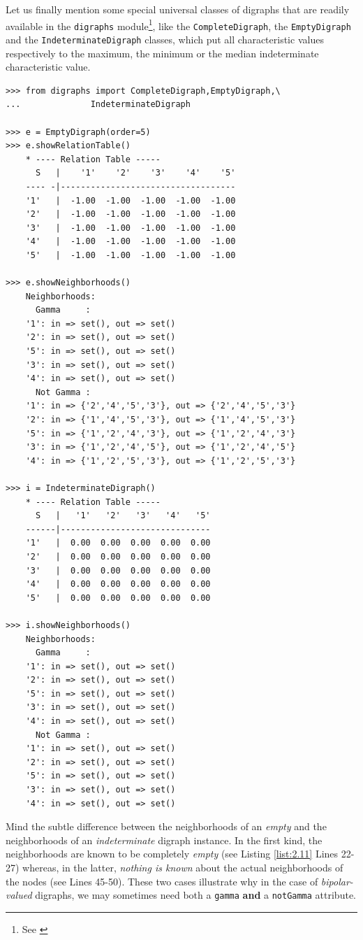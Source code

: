Let us finally mention some special universal classes of digraphs that are readily available in the \texttt{digraphs} module\footnote{See \citealp{BIS-2021}}, like the \texttt{CompleteDigraph}, the \texttt{EmptyDigraph} and the \texttt{IndeterminateDigraph} classes, which put all characteristic values respectively to the maximum, the minimum or the median indeterminate characteristic value.
\begin{lstlisting}[caption={Complete, empty and indeterminate digraphs},label=list:2.11]
>>> from digraphs import CompleteDigraph,EmptyDigraph,\
...   			 IndeterminateDigraph
   
>>> e = EmptyDigraph(order=5)
>>> e.showRelationTable()
    * ---- Relation Table -----
      S   |    '1'    '2'    '3'    '4'	   '5'	  
    ---- -|-----------------------------------
    '1'   |  -1.00  -1.00  -1.00  -1.00	 -1.00	 
    '2'   |  -1.00  -1.00  -1.00  -1.00	 -1.00	 
    '3'   |  -1.00  -1.00  -1.00  -1.00	 -1.00	 
    '4'   |  -1.00  -1.00  -1.00  -1.00	 -1.00	 
    '5'   |  -1.00  -1.00  -1.00  -1.00	 -1.00

>>> e.showNeighborhoods() 
    Neighborhoods:
      Gamma     :
    '1': in => set(), out => set()
    '2': in => set(), out => set()
    '5': in => set(), out => set()
    '3': in => set(), out => set()
    '4': in => set(), out => set()
      Not Gamma :
    '1': in => {'2','4','5','3'}, out => {'2','4','5','3'}
    '2': in => {'1','4','5','3'}, out => {'1','4','5','3'}
    '5': in => {'1','2','4','3'}, out => {'1','2','4','3'}
    '3': in => {'1','2','4','5'}, out => {'1','2','4','5'}
    '4': in => {'1','2','5','3'}, out => {'1','2','5','3'}

>>> i = IndeterminateDigraph()
    * ---- Relation Table -----
      S   |   '1'   '2'	  '3'	'4'   '5'	  
    ------|------------------------------
    '1'   |  0.00  0.00	 0.00  0.00  0.00	 
    '2'   |  0.00  0.00	 0.00  0.00  0.00	 
    '3'   |  0.00  0.00	 0.00  0.00  0.00	 
    '4'   |  0.00  0.00	 0.00  0.00  0.00	 
    '5'   |  0.00  0.00	 0.00  0.00  0.00	 

>>> i.showNeighborhoods()
    Neighborhoods:
      Gamma     :
    '1': in => set(), out => set()
    '2': in => set(), out => set()
    '5': in => set(), out => set()
    '3': in => set(), out => set()
    '4': in => set(), out => set()
      Not Gamma :
    '1': in => set(), out => set()
    '2': in => set(), out => set()
    '5': in => set(), out => set()
    '3': in => set(), out => set()
    '4': in => set(), out => set()
\end{lstlisting}
Mind the subtle difference between the neighborhoods of an \emph{empty} and the neighborhoods of an \emph{indeterminate} digraph instance. In the first kind, the neighborhoods are known to be completely \emph{empty}  (see Listing \ref{list:2.11} Lines 22-27) whereas, in the latter, \emph{nothing is known} about the actual neighborhoods of the nodes  (see Lines 45-50). These two cases illustrate why in the case of \emph{bipolar-valued} digraphs, we may sometimes need both a \texttt{gamma} \textbf{and} a \texttt{notGamma} attribute.

